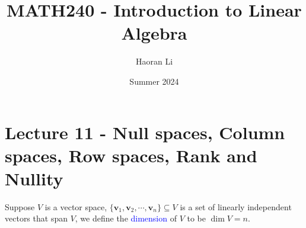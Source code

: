 \documentclass{beamer}
\title{MATH240 - Introduction to Linear Algebra}
\author{Haoran Li}
\institute[UMD]{University of Maryland, College Park}
\date{Summer 2024}
\theoremstyle{definition}
\theoremstyle{remark}
\begin{document}
\maketitle

\section{Lecture 11 - Null spaces, Column spaces, Row spaces, Rank and Nullity}

\begin{frame}[t]
\begin{definition}
Suppose $V$ is a vector space, $\{\bm v_1,\bm v_2,\cdots,\bm v_n\}\subseteq V$ is a set of linearly independent vectors that span $V$, we define the \textcolor{blue}{dimension} of $V$ to be $\dim V=n$.
\end{definition}
\end{frame}
\end{document}

